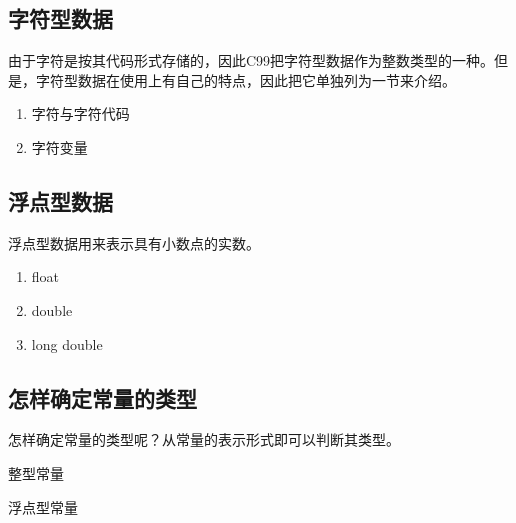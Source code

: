 \subsection{字符型数据}
由于字符是按其代码形式存储的，因此C99把字符型数据作为整数类型的一种。但是，字符型数据在使用上有自己的特点，因此把它单独列为一节来介绍。
\begin{enumerate}
	\item 字符与字符代码
	\item 字符变量
\end{enumerate}
\subsection{浮点型数据}
浮点型数据用来表示具有小数点的实数。
\begin{enumerate}
	\item float
	\item double
	\item long double
\end{enumerate}
\subsection{怎样确定常量的类型}
怎样确定常量的类型呢？从常量的表示形式即可以判断其类型。

整型常量

浮点型常量
